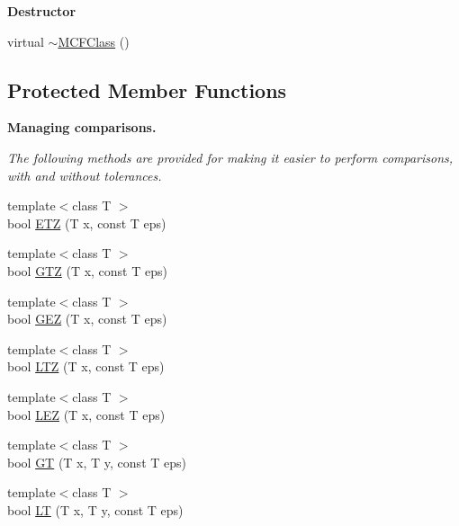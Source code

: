 \begin{Indent}\textbf{ Destructor}\par
\begin{DoxyCompactItemize}
\item 
virtual \mbox{\hyperlink{class_m_c_f_class_a93c0882740d38b9f8eb05994a01f76b7}{$\sim$\+M\+C\+F\+Class}} ()
\end{DoxyCompactItemize}
\end{Indent}
\subsection*{Protected Member Functions}
\begin{Indent}\textbf{ Managing comparisons.}\par
{\em The following methods are provided for making it easier to perform comparisons, with and without tolerances. }\begin{DoxyCompactItemize}
\item 
{\footnotesize template$<$class T $>$ }\\bool \mbox{\hyperlink{class_m_c_f_class_aadaea79b7a516a86d9e318c31ce3d489}{E\+TZ}} (T x, const T eps)
\item 
{\footnotesize template$<$class T $>$ }\\bool \mbox{\hyperlink{class_m_c_f_class_af314a8df7e38143854b9bf17c8eb25fc}{G\+TZ}} (T x, const T eps)
\item 
{\footnotesize template$<$class T $>$ }\\bool \mbox{\hyperlink{class_m_c_f_class_ae414baaa6f224ce576574baa1e71650a}{G\+EZ}} (T x, const T eps)
\item 
{\footnotesize template$<$class T $>$ }\\bool \mbox{\hyperlink{class_m_c_f_class_ab355a057db64a4b3da5209f747c01eae}{L\+TZ}} (T x, const T eps)
\item 
{\footnotesize template$<$class T $>$ }\\bool \mbox{\hyperlink{class_m_c_f_class_adc1dfab25fba0d9badd0cce4dc99933b}{L\+EZ}} (T x, const T eps)
\item 
{\footnotesize template$<$class T $>$ }\\bool \mbox{\hyperlink{class_m_c_f_class_a945c3a54be501ad68f71adaf7771d457}{GT}} (T x, T y, const T eps)
\item 
{\footnotesize template$<$class T $>$ }\\bool \mbox{\hyperlink{class_m_c_f_class_a7c0374fafa5efdfe1d78c22efaa9f9d6}{LT}} (T x, T y, const T eps)
\end{DoxyCompactItemize}
\end{Indent}
